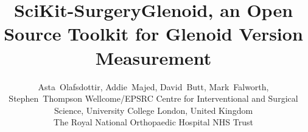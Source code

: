 \documentclass[a4paper, lmargin=1.925cm, rmargin=1.925cm,tmargin=2.54cm,bmargin=4.94cm]{spie}
\begin{document}
%
%
\pagestyle{plain}
%
%
\title{SciKit-SurgeryGlenoid, an Open Source Toolkit for Glenoid Version Measurement}
%
\author{Asta~Olafsdottir, Addie~Majed, David~Butt, Mark~Falworth,
Stephen~Thompson
\skiplinehalf
{}Wellcome/EPSRC Centre for Interventional and Surgical Science, University College London, United Kingdom \\
The Royal National Orthopaedic Hospital NHS Trust\\
}

\maketitle              %

\begin{abstract}

\end{abstract}






%



\end{document}
